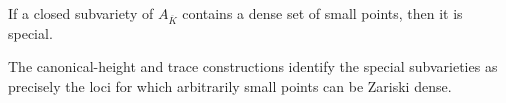 \begin{theorem}
\label{geometric-bogomolov-conjecture-arbitrary-characteristics-main}
If a closed subvariety of $A_{\overline K}$ contains a dense set of small points, then it is special.
\notready
\end{theorem}

\begin{theorem}
\label{geometric-bogomolov-conjecture-arbitrary-characteristics-secondary}
The canonical-height and trace constructions identify the special subvarieties as precisely the loci for which arbitrarily small points can be Zariski dense.
\notready
\end{theorem}

